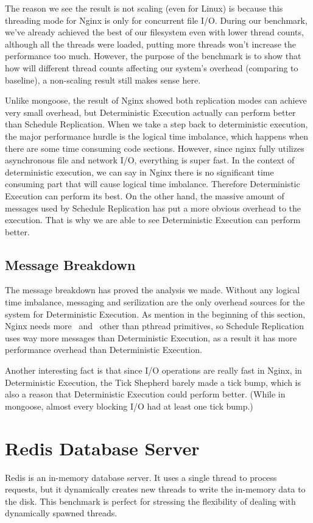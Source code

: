 The reason we see the result is not scaling (even for Linux) is because this threading mode for Nginx is only for concurrent file I/O. During our benchmark, we've already achieved the best of our filesystem even with lower thread counts, although all the threads were loaded, putting more threads won't increase the performance too much. However, the purpose of the benchmark is to show that how will different thread counts affecting our system's overhead (comparing to baseline), a non-scaling result still makes sense here.

Unlike mongoose, the result of Nginx showed both replication modes can achieve very small overhead, but Deterministic Execution actually can perform better than Schedule Replication. When we take a step back to deterministic execution, the major performance hurdle is the logical time imbalance, which happens when there are some time consuming code sections. However, since nginx fully utilizes asynchronous file and network I/O, everything is super fast. In the context of deterministic execution, we can say in Nginx there is no significant time consuming part that will cause logical time imbalance. Therefore Deterministic Execution can perform its best. On the other hand, the massive amount of messages used by Schedule Replication has put a more obvious overhead to the execution. That is why we are able to see Deterministic Execution can perform better.

\subsection{Message Breakdown}

The message breakdown has proved the analysis we made. Without any logical time imbalance, messaging and serilization are the only overhead sources for the system for Deterministic Execution. As mention in the beginning of this section, Nginx needs more \detstart\ and \detend\ other than pthread primitives, so Schedule Replication uses way more messages than Deterministic Execution, as a result it has more performance overhead than Deterministic Execution.

Another interesting fact is that since I/O operations are really fast in Nginx, in Deterministic Execution, the Tick Shepherd barely made a tick bump, which is also a reason that Deterministic Execution could perform better. (While in mongoose, almost every blocking I/O had at least one tick bump.)

\section{Redis Database Server}
Redis is an in-memory database server. It uses a single thread to process requests, but it dynamically creates new threads to write the in-memory data to the disk. This benchmark is perfect for stressing the flexibility of dealing with dynamically spawned threads.

